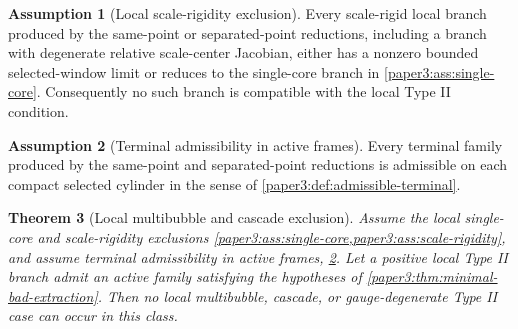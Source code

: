 \documentclass[11pt]{amsart}
\theoremstyle{plain}
\newtheorem{theorem}{Theorem}[section]
\theoremstyle{definition}
\newtheorem{assumption}[theorem]{Assumption}
\theoremstyle{remark}
\begin{document}
\begin{assumption}[Local scale-rigidity exclusion]\label{paper3:ass:scale-rigidity}
Every scale-rigid local branch produced by the same-point or separated-point
reductions, including a branch with degenerate relative scale-center Jacobian,
either has a nonzero bounded selected-window limit or reduces to the single-core
branch in \cref{paper3:ass:single-core}.  Consequently no such branch is compatible
with the local Type II condition.
\end{assumption}

\begin{assumption}[Terminal admissibility in active frames]\label{paper3:ass:terminal-admissibility}
Every terminal family produced by the same-point and separated-point reductions
is admissible on each compact selected cylinder in the sense of
\cref{paper3:def:admissible-terminal}.
\end{assumption}

\begin{theorem}[Local multibubble and cascade exclusion]\label{paper3:thm:multi}
Assume the local single-core and scale-rigidity exclusions
\cref{paper3:ass:single-core,paper3:ass:scale-rigidity}, and assume terminal admissibility in
active frames, \cref{paper3:ass:terminal-admissibility}.  Let a positive local Type II
branch admit an active family satisfying the hypotheses of
\cref{paper3:thm:minimal-bad-extraction}.  Then no local multibubble, cascade, or
gauge-degenerate Type II case can occur in this class.
\end{theorem}
\end{document}
